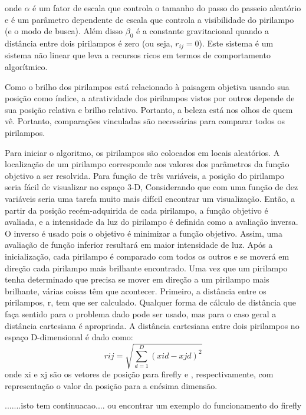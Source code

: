 \documentclass[10pt]{article}
\begin{document}
onde \(\alpha\) é um fator de escala que controla o tamanho 
do passo do passeio aleatório e \gamma é um parâmetro 
dependente de escala que controla a visibilidade do pirilampo
(e o modo de busca). Além disso \(\beta_0\) é a constante 
gravitacional quando a distância entre dois pirilampos é zero
(ou seja, \(r_{ij} = 0\)). Este sistema é um sistema não 
linear que leva a recursos ricos em termos de comportamento 
algorítmico.

Como o brilho dos pirilampos está relacionado à paisagem 
objetiva usando sua posição como índice, a atratividade dos 
pirilampos vistos por outros depende de sua posição relativa
e brilho relativo. Portanto, a beleza está nos olhos de quem vê.
Portanto, comparações vinculadas são necessárias para 
comparar todos os pirilampos.


Para iniciar o algoritmo, os pirilampos são colocados em locais aleatórios. A localização de um pirilampo
corresponde aos valores dos parâmetros da função objetivo a ser resolvida. Para
função de três variáveis, a posição do pirilampo seria fácil de visualizar no espaço 3-D,
Considerando que com uma função de dez variáveis seria uma tarefa muito mais difícil encontrar um
visualização. Então, a partir da posição recém-adquirida de cada pirilampo, a função objetivo é
avaliada, e a intensidade da luz do pirilampo é definida como a avaliação inversa. O inverso é usado
pois o objetivo é minimizar a função objetivo. Assim, uma avaliação de função inferior resultará
em maior intensidade de luz. 
Após a inicialização, cada pirilampo é comparado com todos os outros e se moverá em direção
cada pirilampo mais brilhante encontrado. Uma vez que um pirilampo tenha determinado que precisa se mover em direção a um
pirilampo mais brilhante, várias coisas têm que acontecer. Primeiro, a distância entre os pirilampos, r, tem que
ser calculado. Qualquer forma de cálculo de distância que faça sentido para o problema dado pode ser
usado, mas para o caso geral a distância cartesiana é apropriada. A distância cartesiana
entre dois pirilampos no espaço D-dimensional é dado como:
\begin{equation}
  rij = \sqrt{\sum_{d=1}^{D} (xid -xjd)^2}
\end{equation}
onde xi e xj são os vetores de posição para firefly e , respectivamente, com representação
o valor da posição para a enésima dimensão.


 .......isto tem continuacao....
    ou encontrar um exemplo do funcionamento do firefly
    
    
\end{document}
